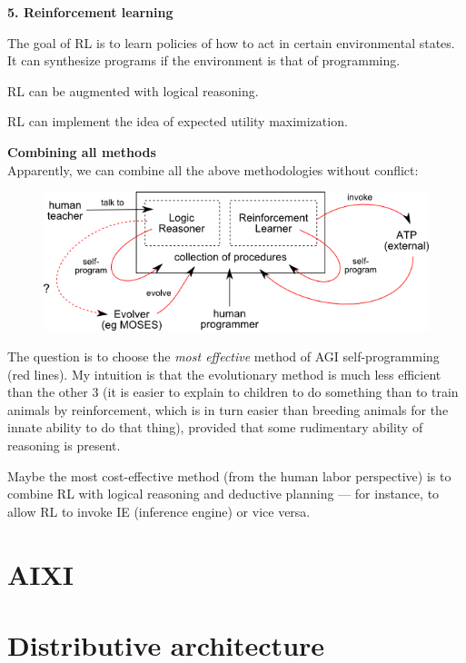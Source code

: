 \textbf{5. Reinforcement learning} 
\begin{compactenum-}[(a)]
\item  The goal of RL is to learn policies of how to act in certain environmental states.  It can synthesize programs if the environment is that of programming.
\item  RL can be augmented with logical reasoning.
\item  RL can implement the idea of expected utility maximization.
\end{compactenum-}

\textbf{Combining all methods}\\
Apparently, we can combine all the above methodologies without conflict:
\begin{figure}[H]
\centering
\includegraphics{combined-architecture.png}
\end{figure}

The question is to choose the \textit{most effective} method of AGI self-programming (red lines).  My intuition is that the evolutionary method is much less efficient than the other 3 (it is easier to explain to children to do something than to train animals by reinforcement, which is in turn easier than breeding animals for the innate ability to do that thing), provided that some rudimentary ability of reasoning is present.

Maybe the most cost-effective method (from the human labor perspective) is to combine RL with logical reasoning and deductive planning --- for instance, to allow RL to invoke IE (inference engine) or vice versa.

\section{AIXI}

\underconst

\section{Distributive architecture}


